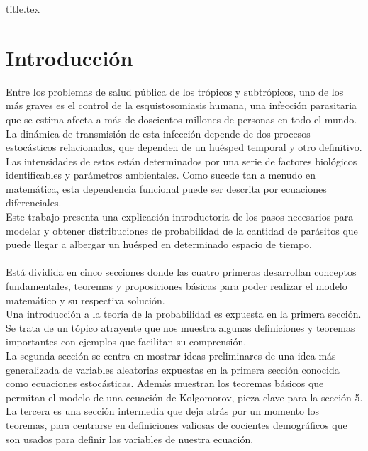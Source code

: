 \documentclass[a4paper,11pt]{book}
\begin{document}
\frontmatter
{title.tex}

\clearpage
\thispagestyle{empty}



 
\tableofcontents

\mainmatter

\chapter*{Introducción}
Entre los problemas de salud pública de los trópicos y subtrópicos, uno de los más graves es el control de la esquistosomiasis humana, una infección parasitaria que se estima afecta a más de doscientos millones de personas en todo el mundo. 
La dinámica de transmisión de esta infección depende de dos procesos estocásticos relacionados, que dependen de un huésped temporal y otro definitivo. Las intensidades de estos están determinados por una serie de factores biológicos identificables y parámetros ambientales. Como sucede tan a menudo en matemática, esta dependencia funcional puede ser descrita por ecuaciones diferenciales.\\ 
Este trabajo presenta una explicación introductoria de los pasos necesarios para modelar y obtener distribuciones de probabilidad de la cantidad de parásitos que puede llegar a albergar un huésped en determinado espacio de tiempo.\\ \\
Está dividida en cinco secciones donde las cuatro primeras desarrollan conceptos fundamentales, teoremas y proposiciones básicas para poder realizar el modelo matemático y su respectiva solución.\\
Una introducción a la teoría de la probabilidad es expuesta en la primera sección. Se trata de un tópico atrayente que nos muestra algunas definiciones y teoremas importantes con ejemplos que facilitan su comprensión.\\
La segunda sección se centra en mostrar ideas preliminares de una idea más generalizada de variables aleatorias expuestas en la primera sección conocida como ecuaciones estocásticas. Además muestran los teoremas básicos que permitan el modelo de una ecuación de Kolgomorov, pieza clave para la sección 5.\\
La tercera es una sección intermedia que deja atrás por un momento los teoremas, para centrarse en definiciones valiosas de cocientes demográficos que son usados para definir las variables de nuestra ecuación.\\
\end{document}
